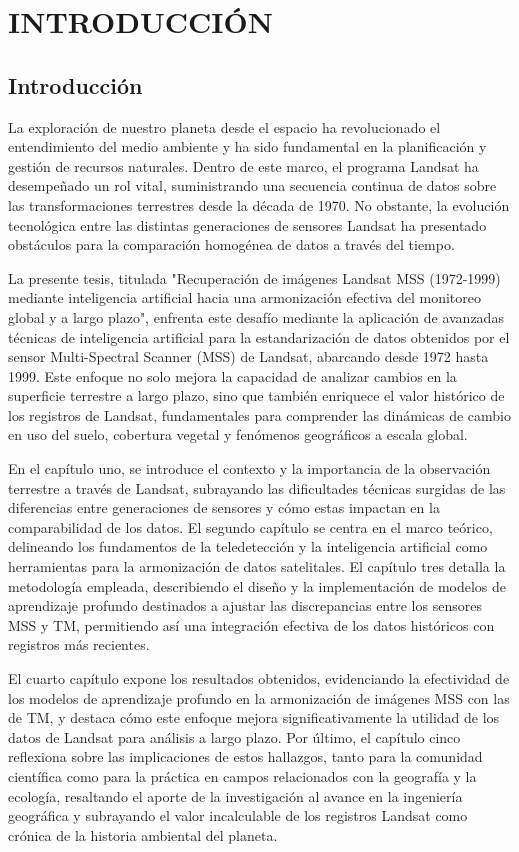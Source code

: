 \Chapter{}

\chapter{INTRODUCCIÓN}
    \section{Introducción}
    La exploración de nuestro planeta desde el espacio ha revolucionado el entendimiento del medio ambiente y ha sido fundamental en la planificación y gestión de recursos naturales. Dentro de este marco, el programa Landsat ha desempeñado un rol vital, suministrando una secuencia continua de datos sobre las transformaciones terrestres desde la década de 1970. No obstante, la evolución tecnológica entre las distintas generaciones de sensores Landsat ha presentado obstáculos para la comparación homogénea de datos a través del tiempo.

    La presente tesis, titulada "Recuperación de imágenes Landsat MSS (1972-1999) mediante inteligencia artificial hacia una armonización efectiva del monitoreo global y a largo plazo", enfrenta este desafío mediante la aplicación de avanzadas técnicas de inteligencia artificial para la estandarización de datos obtenidos por el sensor Multi-Spectral Scanner (MSS) de Landsat, abarcando desde 1972 hasta 1999. Este enfoque no solo mejora la capacidad de analizar cambios en la superficie terrestre a largo plazo, sino que también enriquece el valor histórico de los registros de Landsat, fundamentales para comprender las dinámicas de cambio en uso del suelo, cobertura vegetal y fenómenos geográficos a escala global.
    
    En el capítulo uno, se introduce el contexto y la importancia de la observación terrestre a través de Landsat, subrayando las dificultades técnicas surgidas de las diferencias entre generaciones de sensores y cómo estas impactan en la comparabilidad de los datos. El segundo capítulo se centra en el marco teórico, delineando los fundamentos de la teledetección y la inteligencia artificial como herramientas para la armonización de datos satelitales. El capítulo tres detalla la metodología empleada, describiendo el diseño y la implementación de modelos de aprendizaje profundo destinados a ajustar las discrepancias entre los sensores MSS y TM, permitiendo así una integración efectiva de los datos históricos con registros más recientes.
    
    El cuarto capítulo expone los resultados obtenidos, evidenciando la efectividad de los modelos de aprendizaje profundo en la armonización de imágenes MSS con las de TM, y destaca cómo este enfoque mejora significativamente la utilidad de los datos de Landsat para análisis a largo plazo. Por último, el capítulo cinco reflexiona sobre las implicaciones de estos hallazgos, tanto para la comunidad científica como para la práctica en campos relacionados con la geografía y la ecología, resaltando el aporte de la investigación al avance en la ingeniería geográfica y subrayando el valor incalculable de los registros Landsat como crónica de la historia ambiental del planeta.
